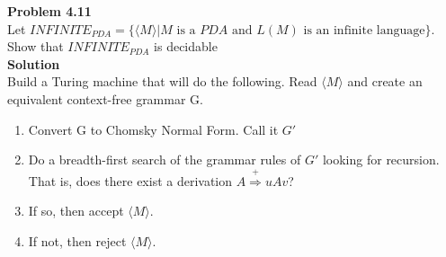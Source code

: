 \documentclass{article}
\newcommand\curl[1]{\{#1\}}
\newcommand{\problem}[1]{\large{\textbf{Problem #1}}\\}
\begin{document}
\pagebreak

\problem{4.11}

    Let $INFINITE_{PDA} = \curl{\langle M \rangle | M \text{ is a } PDA \text{ and } L(M) \text{ is an infinite language}}$.
    Show that $INFINITE_{PDA}$ is decidable \\

    \textbf{Solution}\\

    Build a Turing machine that will do the following.
    Read $\langle M \rangle$ and create an equivalent context-free grammar G.\\

    \begin{enumerate}[1., leftmargin = 0.6cm]
    \itemsep0em
    \item Convert G to Chomsky Normal Form. Call it $G'$
    \item Do a breadth-first search of the grammar rules of $G'$ looking for recursion.
          That is, does there exist a derivation $A \stackrel{+}{\Rightarrow} uAv$?
    \item If so, then accept $\langle M \rangle$.
    \item If not, then reject $\langle M \rangle$.
    \end{enumerate}
\end{document}
